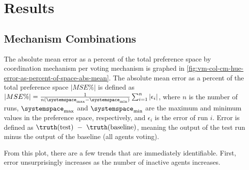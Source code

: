 \section{Results}\label{sec:results}

\subsection{Mechanism Combinations}\label{subsec:mechanism-combinations}
The absolute mean error as a percent of the total preference space by coordination
mechanism per voting mechanism is graphed in
\autoref{fig:vm-col-cm-hue-error-as-percent-of-space-abs-mean}.
The absolute mean error as a percent of the total preference space
$\lvert MSE\% \rvert$  is defined as
$
    \lvert MSE\% \rvert =
    \frac{1}{n (\systemspace_{\max} - \systemspace_{\min})}
        \sum^{n}_{i = 1}{\lvert \epsilon_i  \rvert}
$,
where $n$ is the number of runs, $\systemspace_{\max}$ and $\systemspace_{\min}$ are
the maximum and minimum values in the preference space, respectively, and $\epsilon_i$
is the error of run $i$.
Error is defined as $\truthof{\text{test}}~-~\truthof{\text{baseline}}$, meaning
the output of the test run minus the output of the baseline (all agents voting).

From this plot, there are a few trends that are immediately identifiable.
First, error unsurprisingly increases as the number of inactive agents increases.
%


